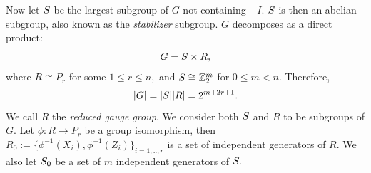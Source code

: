 \documentclass[12pt]{article}
\begin{document}
Now let $S$ be the largest subgroup of $G$ not containing
$-I.$
$S$ is then an abelian subgroup,
also known as the {\it stabilizer} subgroup.
$G$ decomposes as a direct product:
$$G = S\times R,$$
where $R\cong P_r$ for some $1\le r\le n,$
and $S\cong \mathbb{Z}_2^{m}$ for $0\le m<n.$
Therefore, 
$$|G| = |S| |R| = 2^{m+2r+1}.$$
We call $R$ the {\it reduced gauge group}.
We consider both $S$ and $R$ to be subgroups of $G.$
Let $\phi:R\to P_r$ be a group isomorphism,
then $R_0 := \{\phi^{-1}(X_i), \phi^{-1}(Z_i)\}_{i=1,..,r}$
is a set of independent generators of $R.$
We also let $S_0$ be a set of $m$ independent generators of $S.$
\end{document}
